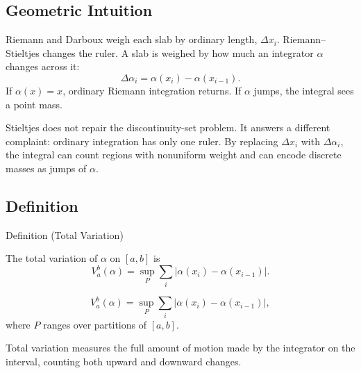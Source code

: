 \subsection*{Geometric Intuition}

\begin{exposition}
Riemann and Darboux weigh each slab by ordinary length, \(\Delta x_i\).
Riemann--Stieltjes changes the ruler. A slab is weighed by how much an
integrator \(\alpha\) changes across it:
\[
  \Delta\alpha_i=\alpha(x_i)-\alpha(x_{i-1}).
\]
If \(\alpha(x)=x\), ordinary Riemann integration returns. If \(\alpha\) jumps,
the integral sees a point mass.
\end{exposition}

\begin{remark*}[Interpretation]
Stieltjes does not repair the discontinuity-set problem. It answers a
different complaint: ordinary integration has only one ruler. By replacing
\(\Delta x_i\) with \(\Delta\alpha_i\), the integral can count regions with
nonuniform weight and can encode discrete masses as jumps of \(\alpha\).
\end{remark*}

\subsection*{Definition}

\begin{definitionbox}{Definition (Total Variation)}
\begin{definition}
\label{def:total-variation}
The total variation of \(\alpha\) on \([a,b]\) is
\[
  V_a^b(\alpha)=\sup_P\sum_i |\alpha(x_i)-\alpha(x_{i-1})|.
\]
\end{definition}
\end{definitionbox}

\begin{remark*}
\[
V_a^b(\alpha)=
\sup_{P}\sum_i\left|\alpha(x_i)-\alpha(x_{i-1})\right|,
\]
where \(P\) ranges over partitions of \([a,b]\).
\end{remark*}

\begin{remark*}[Interpretation]
Total variation measures the full amount of motion made by the integrator on
the interval, counting both upward and downward changes.
\end{remark*}

